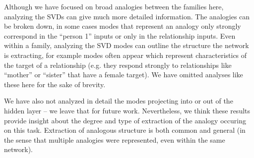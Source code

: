 \documentclass[10pt,letterpaper]{article}
\begin{document}
Although we have focused on broad analogies between the families here, analyzing the SVDs can give much more detailed information. The analogies can be broken down, in some cases modes that represent an analogy only strongly correspond in the ``person 1'' inputs or only in the relationship inputs. Even within a family, analyzing the SVD modes can outline the structure the network is extracting, for example modes often appear which represent characteristics of the target of a relationship (e.g. they respond strongly to relationships like ``mother'' or ``sister'' that have a female target). We have omitted analyses like these here for the sake of brevity. \par 
We have also not analyzed in detail the modes projecting into or out of the hidden layer -- we leave that for future work. Nevertheless, we think these results provide insight about the degree and type of extraction of the analogy occuring on this task. Extraction of analogous structure is both common and general (in the sense that multiple analogies were represented, even within the same network).
\end{document}
